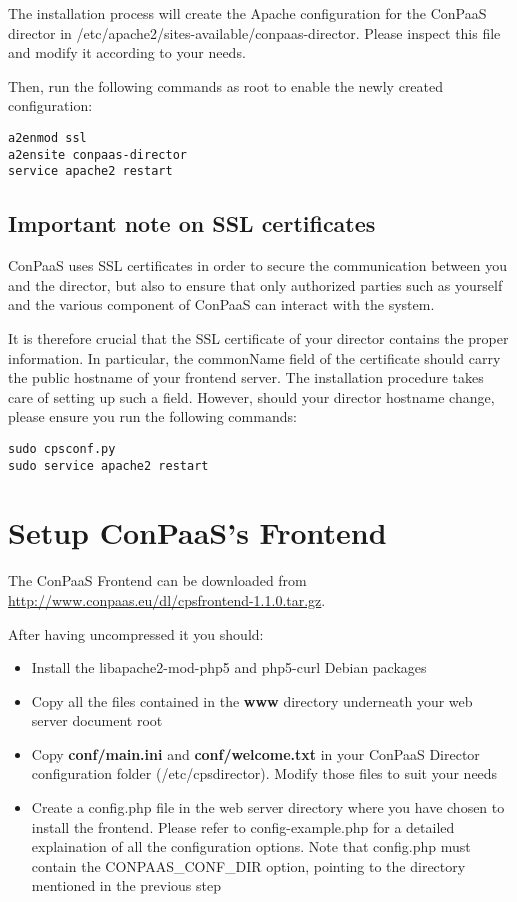 \documentclass[10pt]{article}
\begin{document}
The installation process will create the Apache configuration for the ConPaaS
director in /etc/apache2/sites-available/conpaas-director. Please inspect this
file and modify it according to your needs.

Then, run the following commands as root to enable the newly created
configuration:

\begin{verbatim}
a2enmod ssl
a2ensite conpaas-director
service apache2 restart
\end{verbatim}

\subsection{Important note on SSL certificates}
ConPaaS uses SSL certificates in order to secure the communication between you
and the director, but also to ensure that only authorized parties such as
yourself and the various component of ConPaaS can interact with the system.

It is therefore crucial that the SSL certificate of your director contains the
proper information. In particular, the commonName field of the certificate
should carry the public hostname of your frontend server. The installation
procedure takes care of setting up such a field. However, should your director
hostname change, please ensure you run the following commands:

\begin{verbatim}
sudo cpsconf.py
sudo service apache2 restart
\end{verbatim}

\section{Setup ConPaaS's Frontend}
\label{sec:frontend}

The ConPaaS Frontend can be downloaded from
\url{http://www.conpaas.eu/dl/cpsfrontend-1.1.0.tar.gz}.

After having uncompressed it you should:

\begin{itemize}
\item Install the libapache2-mod-php5 and php5-curl Debian packages
\item Copy all the files contained in the \textbf{www} directory underneath your web server document root
\item Copy \textbf{conf/main.ini} and \textbf{conf/welcome.txt} in your ConPaaS
  Director configuration folder (/etc/cpsdirector). Modify those files to suit
  your needs
\item Create a config.php file in the web server directory where you have chosen to install the
  frontend. Please refer to config-example.php for a detailed explaination of
  all the configuration options. Note that config.php must contain the
  CONPAAS\_CONF\_DIR option, pointing to the directory mentioned in the previous
  step
\end{itemize}
\end{document}
